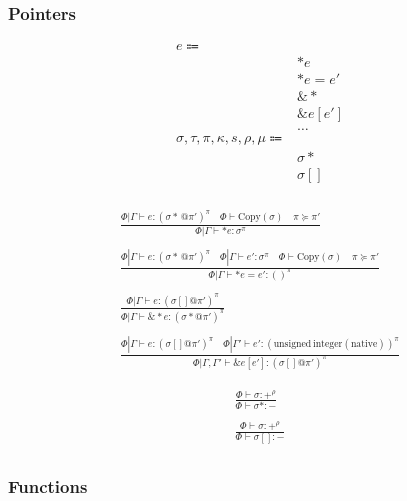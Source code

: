 \documentclass {article}
\begin{document}
\subsubsection{Pointers}
\begin{align*}
e \Coloneqq & \\
& *e \tag{Read Pointer} \\
& *e = e' \tag{Write Pointer} \\
& \& * \tag{Array to Pointer} \\
& \& e [e'] \tag{Array Increment} \\
& \dots \\
\sigma, \tau, \pi, \kappa, s, \rho, \mu \Coloneqq & \\
& \sigma* \tag{Pointer} \\
& \sigma[] \tag{Array Pointer} \\
\end{align*}

\begin{gather*}
\frac
{\Phi | \Gamma \vdash e : (\sigma* \, @ \pi')^\pi \quad \Phi \vdash \text{Copy} (\sigma) \quad \pi \succeq \pi'}
{\Phi | \Gamma \vdash * e  : \sigma^\pi} \\
\\
\frac
{\Phi | \Gamma \vdash e : (\sigma* \, @ \pi')^\pi \quad \Phi | \Gamma \vdash e' : \sigma^\pi  \quad \Phi \vdash \text{Copy} (\sigma) \quad \pi \succeq \pi'}
{\Phi | \Gamma \vdash *e  = e' : ()^\pi } \\
\\
\frac
{\Phi | \Gamma \vdash e : (\sigma[] @ \pi') ^ \pi}
{\Phi | \Gamma \vdash \& * e : (\sigma * @ \pi') ^ \pi}\\
\\
\frac
{\Phi | \Gamma \vdash e : (\sigma [] @ \pi')^\pi \quad \Phi |
 \Gamma' \vdash e' : (\text{unsigned} \, \text{integer}(\text{native}))^\pi}
{\Phi | \Gamma, \Gamma' \vdash \&e [e'] : (\sigma [] @  \pi')^\pi}
\end{gather*}

\begin{gather*}
\frac
{\Phi \vdash \sigma : +^{\rho}}
{\Phi \vdash \sigma* : -} \\
\\
\frac
{\Phi \vdash \sigma : +^{\rho}}
{\Phi \vdash \sigma [] : -} \\
\end{gather*}

\subsubsection{Functions}
\end{document}

